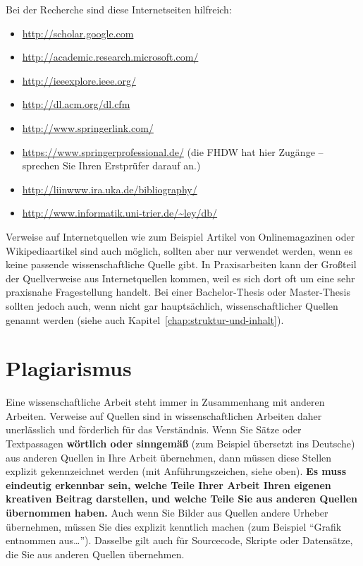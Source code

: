 Bei der Recherche sind diese Internetseiten hilfreich:
\begin{itemize}
  \item \url{http://scholar.google.com}
  \item \url{http://academic.research.microsoft.com/}
  \item \url{http://ieeexplore.ieee.org/}
  \item \url{http://dl.acm.org/dl.cfm}
  \item \url{http://www.springerlink.com/}
  \item \url{https://www.springerprofessional.de/} (die FHDW hat hier Zugänge -- sprechen Sie Ihren Erstprüfer darauf an.)
  \item \url{http://liinwww.ira.uka.de/bibliography/}
  \item \url{http://www.informatik.uni-trier.de/~ley/db/}
\end{itemize}

Verweise auf Internetquellen wie zum Beispiel Artikel von Onlinemagazinen oder Wikipediaartikel sind auch möglich, sollten aber nur verwendet werden, wenn es keine passende wissenschaftliche Quelle gibt. 
In Praxisarbeiten kann der Großteil der Quellverweise aus Internetquellen kommen, weil es sich dort oft um eine sehr praxisnahe Fragestellung handelt. Bei einer Bachelor-Thesis oder Master-Thesis sollten jedoch auch, wenn nicht gar hauptsächlich, wissenschaftlicher Quellen genannt werden (siehe auch Kapitel~\ref{chap:struktur-und-inhalt}).


\section{Plagiarismus}

Eine wissenschaftliche Arbeit steht immer in Zusammenhang mit anderen Arbeiten. Verweise auf Quellen sind in wissenschaftlichen Arbeiten daher unerlässlich und förderlich für das Verständnis. Wenn Sie Sätze oder Textpassagen \textbf{wörtlich oder sinngemäß} (zum Beispiel übersetzt ins Deutsche) aus anderen Quellen in Ihre Arbeit übernehmen, dann müssen diese Stellen explizit gekennzeichnet werden (mit Anführungszeichen, siehe oben). \textbf{Es muss eindeutig erkennbar sein, welche Teile Ihrer Arbeit Ihren eigenen kreativen Beitrag darstellen, und welche Teile Sie aus anderen Quellen übernommen haben.} Auch wenn Sie Bilder aus Quellen andere Urheber übernehmen, müssen Sie dies explizit kenntlich machen (zum Beispiel \enquote{Grafik entnommen aus\ldots}). Dasselbe gilt auch für Sourcecode, Skripte oder Datensätze, die Sie aus anderen Quellen übernehmen.

